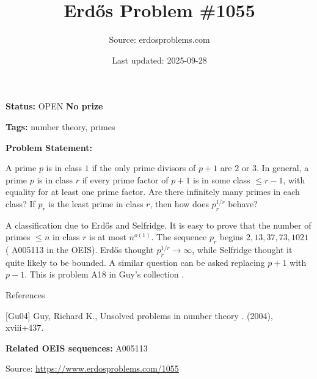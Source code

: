 \documentclass{article}
\title{Erd\H{o}s Problem \#1055}
\date{Last updated: 2025-09-28}
\author{Source: erdosproblems.com}
\begin{document}
\maketitle

\noindent\textbf{Status:} OPEN \quad \textbf{No prize}

\noindent\textbf{Tags:} number theory, primes

\medskip

\noindent\textbf{Problem Statement:}

A prime $p$ is in class $1$ if the only prime divisors of $p+1$ are $2$ or $3$. In general, a prime $p$ is in class $r$ if every prime factor of $p+1$ is in some class $\leq r-1$, with equality for at least one prime factor. Are there infinitely many primes in each class? If $p_r$ is the least prime in class $r$, then how does $p_r^{1/r}$ behave?




A classification due to Erd\H{o}s and Selfridge. It is easy to prove that the number of primes $\leq n$ in class $r$ is at most $n^{o(1)}$. The sequence $p_r$ begins $2,13,37,73,1021$ ( A005113 in the OEIS). Erd\H{o}s thought $p_r^{1/r}\to \infty$, while Selfridge thought it quite likely to be bounded. A similar question can be asked replacing $p+1$ with $p-1$. This is problem A18 in Guy's collection \cite{Gu04}.




References

[Gu04] Guy, Richard K., Unsolved problems in number theory . (2004), xviii+437.

\noindent\textbf{Related OEIS sequences:} A005113


\bigskip
\noindent\small{Source: \url{https://www.erdosproblems.com/1055}}
\end{document}
